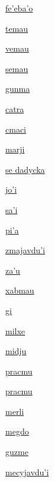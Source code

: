 {\hyperlink{val:fehebaho}{fe'eba'o}}{}{}{}

{\hyperlink{val:temau}{temau}}{}{}{}

{\hyperlink{val:vemau}{vemau}}{}{}{}

{\hyperlink{val:semau}{semau}}{}{}{}

{\hyperlink{val:gunma}{gunma}}{}{}{}

{\hyperlink{val:catra}{catra}}{}{}{}

{\hyperlink{val:cmaci}{cmaci}}{}{}{}

{\hyperlink{val:marji}{marji}}{}{}{}

{\hyperlink{val:dadycka}{se dadycka}}{}{}{}

{\hyperlink{val:johi}{jo'i}}{}{}{}

{\hyperlink{val:sahi}{sa'i}}{}{}{}

{\hyperlink{val:piha}{pi'a}}{}{}{}

{\hyperlink{val:zmajavduhi}{zmajavdu'i}}{}{}{}

{\hyperlink{val:zahu}{za'u}}{}{}{}

{\hyperlink{val:xabmau}{xabmau}}{}{}{}

{\hyperlink{val:gi}{gi}}{}{}{}

{\hyperlink{val:milxe}{milxe}}{}{}{}

{\hyperlink{val:midju}{midju}}{}{}{}

{\hyperlink{val:pracmu}{pracmu}}{}{}{}

{\hyperlink{val:pracmu}{pracmu}}{}{}{}

{\hyperlink{val:merli}{merli}}{}{}{}

{\hyperlink{val:megdo}{megdo}}{}{}{}

{\hyperlink{val:guzme}{guzme}}{}{}{}

{\hyperlink{val:mecyjavduhi}{mecyjavdu'i}}{}{}{}

